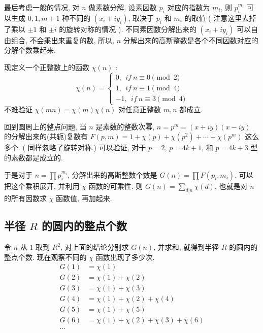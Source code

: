 最后考虑一般的情况, 对 $ n $ 做素数分解, 设素因数 $ p_i $ 对应的指数为 $ m_i $, 则 $ p_i^{m_i} $ 可以生成 $ 0, 1, m+1 $ 种不同的 $(x_i+iy_i)$, 取决于 $ p_i $ 和 $ m_i $ 的取值 ( 注意这里去掉了乘以 $ \pm 1 $ 和 $ \pm i $ 的旋转对称的情况 ). 不同素因数分解出来的 $(x_i+iy_i)$ 可以自由组合, 不会乘出来重复的数, 所以, $ n $ 分解出来的高斯整数是各个不同因数对应的分解个数乘起来.


现定义一个正整数上的函数 $ \chi(n) $ : 
\begin{equation*}
\chi(n) = \begin{cases}
0,\ \ if \ n \equiv 0 \pmod{2}\\
1,\ \ if \ n \equiv 1 \pmod{4}\\
-1,\ \ if \ n \equiv 3 \pmod{4}
\end{cases}
\end{equation*}
不难验证 $ \chi(mn) = \chi(m)\chi(n) $ 对任意正整数 $ m, n $ 都成立.

回到圆周上的整点问题, 当 $ n $ 是素数的整数次幂, $ n=p^m=(x+iy)(x-iy) $ 的分解出来的(共轭)复数有 $ F(p,m) = 1 + \chi(p) + \chi(p^2) + \cdots + \chi(p^m) $ 这么多个. ( 同样忽略了旋转对称.) 可以验证, 对于 $ p = 2 $, $ p = 4k+1 $, 和 $ p=4k+3 $ 型的素数都是成立的. 

于是对于 $ n = \prod{p_i^{m_i}} $, 分解出来的高斯整数个数是 $ G(n) = \prod{F(p_i,m_i)} $. 可以把这个乘积展开, 并利用 $ \chi $ 函数的可乘性. 则 $ G(n) = \sum_{d|n}{\chi(d)} $, 也就是对 $ n $ 的所有因数求 $ \chi $ 函数值, 再加起来. 

\subsection{半径 \texorpdfstring{$ R $}{R} 的圆内的整点个数}
令 $ n $ 从 $ 1 $ 取到 $ R^2 $, 对上面的结论分别求 $ G(n) $, 并求和, 就得到半径 $ R $ 的圆内的整点个数. 现在观察不同的 $ \chi $ 函数出现了多少次.
\begin{align*}
G(1) &= \chi(1) \\
G(2) &= \chi(1) + \chi(2) \\
G(3) &= \chi(1) + \chi(3) \\
G(4) &= \chi(1) + \chi(2) + \chi(4) \\
G(5) &= \chi(1) + \chi(5) \\
G(6) &= \chi(1) + \chi(2) + \chi(3) + \chi(6)\\
\cdots
\end{align*}

